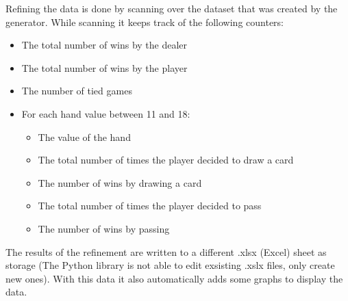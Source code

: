 Refining the data is done by scanning over the dataset that was created by the generator. While scanning it keeps track of the following counters:
\begin{itemize}
  \item The total number of wins by the dealer
  \item The total number of wins by the player
  \item The number of tied games
  \item For each hand value between 11 and 18:
    \begin{itemize}
        \item The value of the hand
        \item The total number of times the player decided to draw a card
        \item The number of wins by drawing a card
        \item The total number of times the player decided to pass
        \item The number of wins by passing
    \end{itemize}
\end{itemize}
The results of the refinement are written to a different .xlsx (Excel) sheet as storage (The Python library is not able to edit exsisting .xslx files, only create new ones). With this data it also automatically adds some graphs to display the data.
